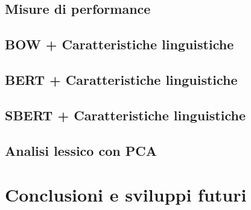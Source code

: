 \documentclass[oneside]{book}
\begin{document}
\section{Misure di performance}
\section{BOW + Caratteristiche linguistiche}
\section{BERT + Caratteristiche linguistiche}
\section{SBERT + Caratteristiche linguistiche}
\section{Analisi lessico con PCA}


\chapter{Conclusioni e sviluppi futuri}
\end{document}
